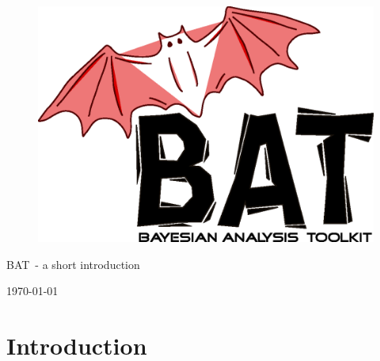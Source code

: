 \documentclass[11pt, a4paper]{article}
\newcommand{\bat}{{\sc BAT}}
\begin{document}

\thispagestyle{empty}

\begin{figure}
\includegraphics[scale=0.25]{bat.eps}
\end{figure}

\vspace{1.0cm}

\begin{center}

{\Large \bat\ - a short introduction}

\end{center}

\thispagestyle{empty}

\vspace{17.0cm}

\begin{center}
\today
\end{center}

\pagebreak


\thispagestyle{empty}

\tableofcontents

\pagebreak

\section{Introduction}
\label{section:introduction}
\end{document}
